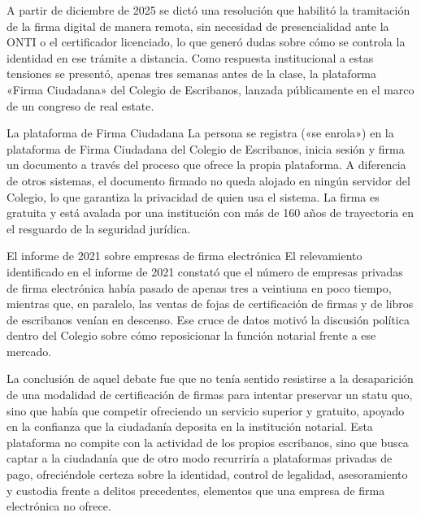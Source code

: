 \documentclass[12pt,oneside]{book}
\begin{document}
A partir de diciembre de 2025 se dictó una resolución que habilitó la tramitación de la firma digital de manera remota, sin necesidad de presencialidad ante la ONTI o el certificador licenciado, lo que generó dudas sobre cómo se controla la identidad en ese trámite a distancia. Como respuesta institucional a estas tensiones se presentó, apenas tres semanas antes de la clase, la plataforma «Firma Ciudadana» del Colegio de Escribanos, lanzada públicamente en el marco de un congreso de real estate.

\begin{example}{La plataforma de Firma Ciudadana}
La persona se registra («se enrola») en la plataforma de Firma Ciudadana del Colegio de Escribanos, inicia sesión y firma un documento a través del proceso que ofrece la propia plataforma. A diferencia de otros sistemas, el documento firmado no queda alojado en ningún servidor del Colegio, lo que garantiza la privacidad de quien usa el sistema. La firma es gratuita y está avalada por una institución con más de 160 años de trayectoria en el resguardo de la seguridad jurídica.
\end{example}


\begin{example}{El informe de 2021 sobre empresas de firma electrónica}
El relevamiento identificado en el informe de 2021 constató que el número de empresas privadas de firma electrónica había pasado de apenas tres a veintiuna en poco tiempo, mientras que, en paralelo, las ventas de fojas de certificación de firmas y de libros de escribanos venían en descenso. Ese cruce de datos motivó la discusión política dentro del Colegio sobre cómo reposicionar la función notarial frente a ese mercado.
\end{example}

La conclusión de aquel debate fue que no tenía sentido resistirse a la desaparición de una modalidad de certificación de firmas para intentar preservar un statu quo, sino que había que competir ofreciendo un servicio superior y gratuito, apoyado en la confianza que la ciudadanía deposita en la institución notarial. Esta plataforma no compite con la actividad de los propios escribanos, sino que busca captar a la ciudadanía que de otro modo recurriría a plataformas privadas de pago, ofreciéndole certeza sobre la identidad, control de legalidad, asesoramiento y custodia frente a delitos precedentes, elementos que una empresa de firma electrónica no ofrece.
\end{document}
